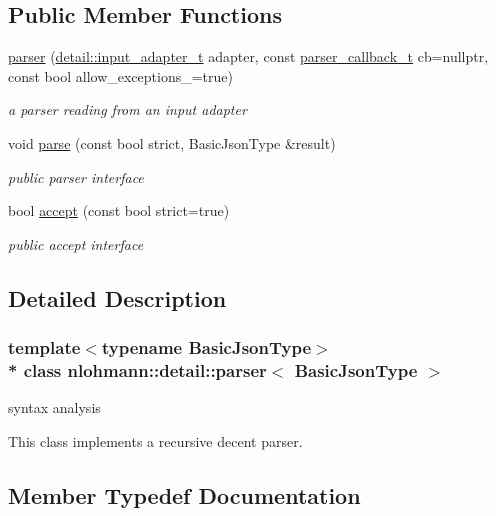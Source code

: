 \subsection*{Public Member Functions}
\begin{DoxyCompactItemize}
\item 
\hyperlink{classnlohmann_1_1detail_1_1parser_a693aa2a6c0cc665e0e45bacf055460e6}{parser} (\hyperlink{namespacenlohmann_1_1detail_ae132f8cd5bb24c5e9b40ad0eafedf1c2}{detail\+::input\+\_\+adapter\+\_\+t} adapter, const \hyperlink{classnlohmann_1_1detail_1_1parser_ad250ad4f2b4af4a497e727c963162ff1}{parser\+\_\+callback\+\_\+t} cb=nullptr, const bool allow\+\_\+exceptions\+\_\+=true)
\begin{DoxyCompactList}\small\item\em a parser reading from an input adapter \end{DoxyCompactList}\item 
void \hyperlink{classnlohmann_1_1detail_1_1parser_a14338d8f3174601c0b2b7ef28752ab17}{parse} (const bool strict, Basic\+Json\+Type \&result)
\begin{DoxyCompactList}\small\item\em public parser interface \end{DoxyCompactList}\item 
bool \hyperlink{classnlohmann_1_1detail_1_1parser_a20997b42262856935b60fc91bf05bf3f}{accept} (const bool strict=true)
\begin{DoxyCompactList}\small\item\em public accept interface \end{DoxyCompactList}\end{DoxyCompactItemize}


\subsection{Detailed Description}
\subsubsection*{template$<$typename Basic\+Json\+Type$>$\\*
class nlohmann\+::detail\+::parser$<$ Basic\+Json\+Type $>$}

syntax analysis 

This class implements a recursive decent parser. 

\subsection{Member Typedef Documentation}
